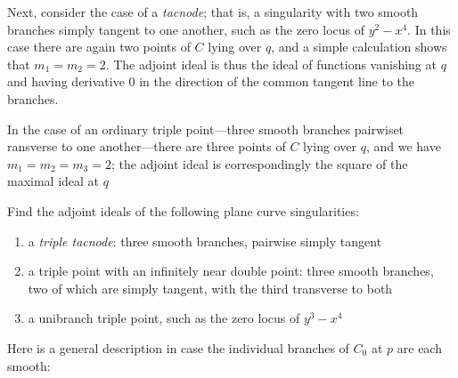 

\begin{example}[tacnodes]
Next, consider the case of a \emph{tacnode}; that is, a singularity with two smooth branches simply tangent to one another, such as the zero locus of $y^2-x^4$. In this case there are again two points of $C$ lying over $q$, and a simple calculation shows that $m_1=m_2=2$. The adjoint ideal is thus the ideal of functions vanishing at $q$ and having derivative 0 in the direction of the common tangent line to the branches.
\end{example}

\begin{exercise}
In the case of an ordinary triple point---three smooth branches pairwiset ransverse to one another---there are three points of $C$ lying over $q$, and we have $m_1=m_2=m_3= 2$; the adjoint ideal is correspondingly 
 the square of the maximal ideal at $q$
\end{exercise}

\begin{exercise}
Find the adjoint ideals of the following plane curve singularities:
\begin{enumerate}
\item a \emph{triple tacnode}: three smooth branches, pairwise simply tangent
\item a triple point with an infinitely near double point: three smooth branches, two of which are simply tangent, with the third transverse to both
\item a unibranch triple point, such as the zero locus of $y^3-x^4$
\end{enumerate}
\end{exercise}

Here is a  general description in case the individual branches of $C_0$ at $p$ are each smooth:

